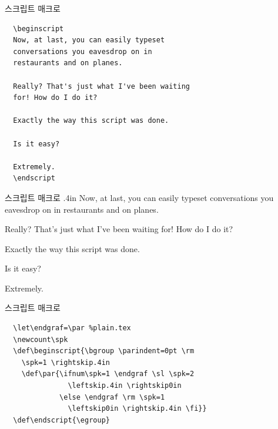 \documentclass{beamer}
\begin{document}
%
\begin{frame}[fragile]{스크립트 매크로}
  \small
\begin{verbatim}
  \beginscript
  Now, at last, you can easily typeset
  conversations you eavesdrop on in
  restaurants and on planes.
  
  Really? That's just what I've been waiting
  for! How do I do it?
  
  Exactly the way this script was done.
  
  Is it easy?
  
  Extremely.
  \endscript
\end{verbatim}
\end{frame}


%
\newcount\spk
\def\beginscript{\bgroup \parindent=0pt \rm \spk=1 \rightskip.4in
  \def\par{\ifnum\spk=1 \endgraf \sl \spk=2 \leftskip.4in \rightskip0in
    \else \endgraf \rm \spk=1 \leftskip0in \rightskip.4in \fi}}
\def\endscript {\egroup}

\begin{frame}[fragile]{스크립트 매크로}
  \hsize 3in
  \beginscript
  Now, at last, you can easily typeset
  conversations you eavesdrop on in
  restaurants and on planes.
  
  Really? That's just what I've been waiting
  for! How do I do it?
  
  Exactly the way this script was done.
  
  Is it easy?
  
  Extremely.
  \endscript
\end{frame}


%
\begin{frame}[fragile]{스크립트 매크로}
\begin{verbatim}
  \let\endgraf=\par %plain.tex 
  \newcount\spk
  \def\beginscript{\bgroup \parindent=0pt \rm
    \spk=1 \rightskip.4in
    \def\par{\ifnum\spk=1 \endgraf \sl \spk=2
               \leftskip.4in \rightskip0in
             \else \endgraf \rm \spk=1
               \leftskip0in \rightskip.4in \fi}}
  \def\endscript{\egroup}
\end{verbatim}
\end{frame}
\end{document}
